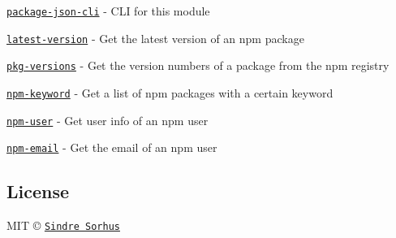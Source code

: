 \begin{DoxyItemize}
\item \href{https://github.com/sindresorhus/package-json-cli}{\tt package-\/json-\/cli} -\/ C\+LI for this module
\item \href{https://github.com/sindresorhus/latest-version}{\tt latest-\/version} -\/ Get the latest version of an npm package
\item \href{https://github.com/sindresorhus/pkg-versions}{\tt pkg-\/versions} -\/ Get the version numbers of a package from the npm registry
\item \href{https://github.com/sindresorhus/npm-keyword}{\tt npm-\/keyword} -\/ Get a list of npm packages with a certain keyword
\item \href{https://github.com/sindresorhus/npm-user}{\tt npm-\/user} -\/ Get user info of an npm user
\item \href{https://github.com/sindresorhus/npm-email}{\tt npm-\/email} -\/ Get the email of an npm user
\end{DoxyItemize}

\subsection*{License}

M\+IT © \href{https://sindresorhus.com}{\tt Sindre Sorhus} 